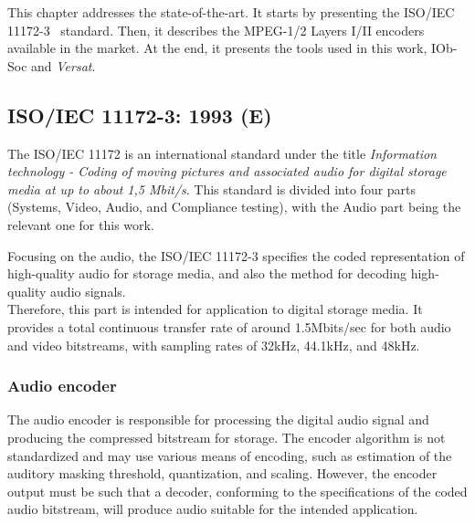  

This chapter addresses the state-of-the-art. It starts by presenting the ISO/IEC 11172-3~\cite{11172} standard. Then, it describes the MPEG-1/2 Layers I/II encoders available in the market. At the end, it presents the tools used in this work, IOb-Soc and \textit{Versat}.

\subsection{ISO/IEC 11172-3: 1993 (E)}

The ISO/IEC 11172 is an international standard under the title \textit{Information technology - Coding of moving pictures and associated audio for digital storage media at up to about 1,5 Mbit/s}. This standard is divided into four parts (Systems, Video, Audio, and Compliance testing), with the Audio part being the relevant one for this work.

Focusing on the audio, the ISO/IEC 11172-3 specifies the coded representation of high-quality audio for storage media, and also the method for decoding high-quality audio signals. \\
Therefore, this part is intended for application to digital storage media. It provides a total continuous transfer rate of around 1.5Mbits/sec for both audio and video bitstreams, with sampling rates of 32kHz, 44.1kHz, and 48kHz.

\subsubsection{Audio encoder}

The audio encoder is responsible for processing the digital audio signal and producing the compressed bitstream for storage. 
The encoder algorithm is not standardized and may use various means of encoding, such as estimation of the auditory masking threshold, quantization, and scaling. However, the encoder output must be such that a decoder, conforming to the specifications of the coded audio bitstream, will produce audio suitable for the intended application.

